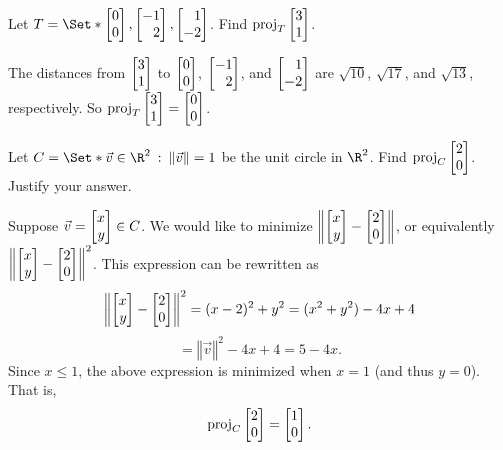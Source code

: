 \begin{exercises}
	\begin{problist}

\prob
Let $T=\Set*{\mat{0\\0}, \mat{-1\\2}, \mat{1\\-2}}$. Find $\Proj_T \mat{3 \\ 1}$.
		\begin{solution}
	The distances from $\mat{ 3 \\ 1 }$ to $\mat{0\\0}$,
	$\mat{-1\\2}$, and $\mat{1\\-2}$ are $\sqrt{10}$, $\sqrt{17}$,
	and $\sqrt{13}$, respectively. So $\Proj_T \mat{3 \\ 1} = \mat{
	0 \\ 0}$.
		\end{solution}

\prob
		Let $C=\Set*{ \vec v \in \R^2\given \norm{ \vec v} = 1}$ be the unit circle in $\R^2$. 
		Find $\Proj_C \mat{2 \\ 0}$. Justify your answer.
		\begin{solution}
			Suppose $\vec v=\mat{x\\y}\in C$. We would like to minimize $\left
\Vert \mat{ x \\ y } - \mat{ 2 \\ 0 } \right \Vert$, or equivalently
$\left \Vert \mat{ x \\ y } - \mat{ 2 \\ 0 } \right \Vert^2$.  This
expression can be rewritten as 
			\[ 
			\left \Vert \mat{ x \\ y } - \mat{
				2 \\ 0 } \right \Vert^2 = (x-2)^2+y^2 = (x^2+y^2)-4x+4 \]\[= \left\Vert
\vec v \right \Vert^2-4x+4 = 5 - 4x.  
			\] 
			Since $x \leq 1$, the above
			expression is minimized when $x = 1$ (and thus $y = 0$).  That is, \[
\Proj_C \mat{2 \\ 0} = \mat{ 1 \\ 0 }.  \]

		\end{solution}


\end{problist}
\end{exercises}
